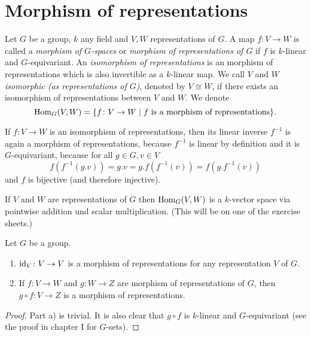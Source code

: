 \section{Morphism of representations}


\begin{defi}
Let $G$ be a group, $k$ any field and $V,W$ representations of $G$.
A map $f \colon V \to W$ is called a \emph{morphism of $G$-spaces} or \emph{morphism of representations of $G$} if $f$ is $k$-linear and $G$-equivariant.
An \emph{isomorphism of representations} is an morphism of representations which is also invertible as a $k$-linear map.
We call $V$ and $W$ \emph{isomorphic (as representations of $G$)}, denoted by $V \cong W$, if there exists an isomorphism of representations between $V$ and $W$.
We denote
\[
    \operatorname{Hom}_G(V,W)
  = \{
      f \colon V \to W
    \mid
      f \text{ is a morphism of representations}
    \}.
\]
\end{defi}


\begin{rem}
  If $f \colon V \to W$ is an isomorphism of representations, then its linear inverse $f^{-1}$ is again a morphism of representations, because $f^{-1}$ is linear by definition and it is $G$-equivariant, because for all $g \in G, v \in V$
  \[
      f\left( f^{-1}(g.v) \right)
    = g.v
    = g.f\left( f^{-1}(v) \right)
    = f\left( g.f^{-1}(v) \right)
  \]
  and $f$ is bijective (and therefore injective).
\end{rem}


\begin{rem}
  If $V$ and $W$ are representations of $G$ then $\operatorname{Hom}_G(V,W)$ is a $k$-vector space via pointwise addition und scalar multiplication.
  (This will be on one of the exercise sheets.)
\end{rem}


\begin{lem}\label{lem: composition of morphisms of representations}
  Let $G$ be a group.
  \begin{enumerate}[label=\emph{\alph*)},leftmargin=*]
    \item
      $\operatorname{id}_V \colon V \to V$ is a morphism of representations for any representation $V$ of $G$.
    \item
      If $f \colon V \to W$  and $g \colon W \to Z$ are morphism of representations of $G$, then $g \circ f \colon V \to Z$ is a morphism of representations.
  \end{enumerate}
\end{lem}
\begin{proof}
  Part a) is trivial.
  It is also clear that $g \circ f$ is $k$-linear and $G$-equivariant (see the proof in chapter I for $G$-sets).
\end{proof}


